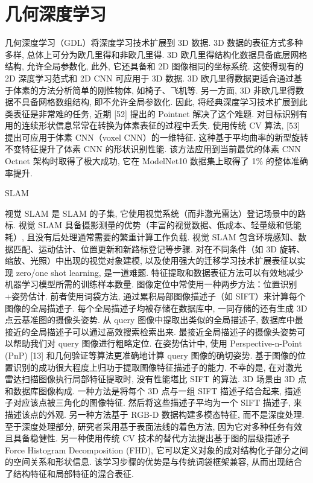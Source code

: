 \section{几何深度学习}
几何深度学习（GDL）将深度学习技术扩展到 3D 数据. 3D 数据的表征方式多种多样, 总体上可分为欧几里得和非欧几里得. 3D 欧几里得结构化数据具备底层网格结构, 允许全局参数化, 此外, 它还具备和 2D 图像相同的坐标系统. 这使得现有的 2D 深度学习范式和 2D CNN 可应用于 3D 数据. 3D 欧几里得数据更适合通过基于体素的方法分析简单的刚性物体, 如椅子、飞机等. 另一方面, 3D 非欧几里得数据不具备网格数组结构, 即不允许全局参数化. 因此, 将经典深度学习技术扩展到此类表征是非常难的任务, 近期 [52] 提出的 Pointnet 解决了这个难题.
对目标识别有用的连续形状信息常常在转换为体素表征的过程中丢失. 使用传统 CV 算法, [53] 提出可应用于体素 CNN（voxel CNN）的一维特征. 这种基于平均曲率的新型旋转不变特征提升了体素 CNN 的形状识别性能. 该方法应用到当前最优的体素 CNN Octnet 架构时取得了极大成功, 它在 ModelNet10 数据集上取得了 1\% 的整体准确率提升.

SLAM

视觉 SLAM 是 SLAM 的子集, 它使用视觉系统（而非激光雷达）登记场景中的路标. 视觉 SLAM 具备摄影测量的优势（丰富的视觉数据、低成本、轻量级和低能耗）, 且没有后处理通常需要的繁重计算工作负载. 视觉 SLAM 包含环境感知、数据匹配、运动估计、位置更新和新路标登记等步骤.
对在不同条件（如 3D 旋转、缩放、光照）中出现的视觉对象建模, 以及使用强大的迁移学习技术扩展表征以实现 zero/one shot learning, 是一道难题. 特征提取和数据表征方法可以有效地减少机器学习模型所需的训练样本数量.
图像定位中常使用一种两步方法：位置识别+姿势估计. 前者使用词袋方法, 通过累积局部图像描述子（如 SIFT）来计算每个图像的全局描述子. 每个全局描述子均被存储在数据库中, 一同存储的还有生成 3D 点云基准图的摄像头姿势. 从 query 图像中提取出类似的全局描述子, 数据库中最接近的全局描述子可以通过高效搜索检索出来. 最接近全局描述子的摄像头姿势可以帮助我们对 query 图像进行粗略定位. 在姿势估计中, 使用 Perspective-n-Point (PnP) [13] 和几何验证等算法更准确地计算 query 图像的确切姿势.
基于图像的位置识别的成功很大程度上归功于提取图像特征描述子的能力. 不幸的是, 在对激光雷达扫描图像执行局部特征提取时, 没有性能堪比 SIFT 的算法. 3D 场景由 3D 点和数据库图像构成. 一种方法是将每个 3D 点与一组 SIFT 描述子结合起来, 描述子对应该点被三角化的图像特征. 然后将这些描述子平均为一个 SIFT 描述子, 来描述该点的外观.
另一种方法基于 RGB-D 数据构建多模态特征, 而不是深度处理. 至于深度处理部分, 研究者采用基于表面法线的着色方法, 因为它对多种任务有效且具备稳健性. 另一种使用传统 CV 技术的替代方法提出基于图的层级描述子 Force Histogram Decomposition (FHD), 它可以定义对象的成对结构化子部分之间的空间关系和形状信息. 该学习步骤的优势是与传统词袋框架兼容, 从而出现结合了结构特征和局部特征的混合表征.

